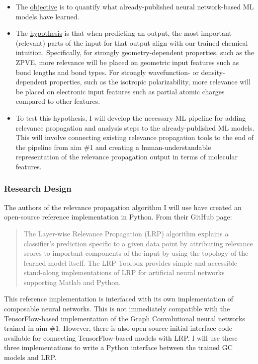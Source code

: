 \documentclass[12pt]{article}
\begin{document}
\begin{itemize}
\item The \uline{objective} is to quantify what already-published neural network-based ML models have learned.

\item The \uline{hypothesis} is that when predicting an output, the most important (relevant) parts of the input for that output align with our trained chemical intuition. Specifically, for strongly geometry-dependent properties, such as the ZPVE, more relevance will be placed on geometric input features such as bond lengths and bond types. For strongly wavefunction- or density-dependent properties, such as the isotropic polarizability, more relevance will be placed on electronic input features such as partial atomic charges compared to other features.

\item To test this hypothesis, I will develop the necessary ML pipeline for adding relevance propagation and analysis steps to the already-published ML models. This will involve connecting existing relevance propagation tools \cite{JMLR:v17:15-618,github:lrp,github:lrp_tf,github:lrp_tf2} to the end of the pipeline from aim \#1 and creating a human-understandable representation of the relevance propagation output in terms of molecular features.
\end{itemize}

\subsubsection{Research Design}
\label{sec:org1315518}

The authors of the relevance propagation algorithm I will use have created an open-source reference implementation in Python. From their GitHub page\cite{github:lrp}:

\begin{quote}
The Layer-wise Relevance Propagation (LRP) algorithm explains a classifier's prediction specific to a given data point by attributing relevance scores to important components of the input by using the topology of the learned model itself. The LRP Toolbox provides simple and accessible stand-along implementations of LRP for artificial neural networks supporting Matlab and Python.
\end{quote}

This reference implementation is interfaced with its own implementation of composable neural networks. This is not immediately compatible with the TensorFlow-based implementation of the Graph Convolutional neural networks trained in aim \#1. However, there is also open-source initial interface code available for connecting TensorFlow-based models with LRP\cite{github:lrp_tf,github:lrp_tf2}. I will use these three implementations to write a Python interface between the trained GC models and LRP.
\end{document}
